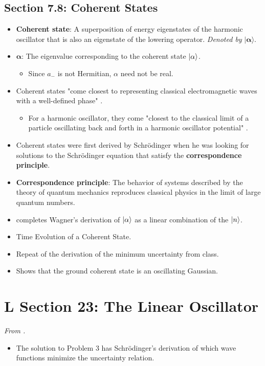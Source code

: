 \documentclass[../notes.tex]{subfiles}
\begin{document}
\subsection*{Section 7.8: Coherent States}
\begin{itemize}
    \item \textbf{Coherent state}: A superposition of energy eigenstates of the harmonic oscillator that is also an eigenstate of the lowering operator. \emph{Denoted by} $\bm{|\alpha\rangle}$.
    \item $\bm{\alpha}$: The eigenvalue corresponding to the coherent state $\ket{\alpha}$.
    \begin{itemize}
        \item Since $a_-$ is not Hermitian, $\alpha$ need not be real.
    \end{itemize}
    \item Coherent states "come closest to representing classical electromagnetic waves with a well-defined phase" \parencite[263]{bib:Townsend}.
    \begin{itemize}
        \item For a harmonic oscillator, they come "closest to the classical limit of a particle oscillating back and forth in a harmonic oscillator potential" \parencite[263]{bib:Townsend}.
    \end{itemize}
    \item Coherent states were first derived by Schr\"{o}dinger when he was looking for solutions to the Schr\"{o}dinger equation that satisfy the \textbf{correspondence principle}.
    \item \textbf{Correspondence principle}: The behavior of systems described by the theory of quantum mechanics reproduces classical physics in the limit of large quantum numbers.
    \item \textcite{bib:Townsend} completes Wagner's derivation of $\ket{\alpha}$ as a linear combination of the $\ket{n}$.
    \item Time Evolution of a Coherent State.
    \item Repeat of the derivation of the minimum uncertainty from class.
    \item Shows that the ground coherent state is an oscillating Gaussian.
\end{itemize}



\section{L Section 23: The Linear Oscillator}
\emph{From \textcite{bib:Landau}.}
\begin{itemize}
    \item The solution to Problem 3 has Schr\"{o}dinger's derivation of which wave functions minimize the uncertainty relation.
\end{itemize}
\end{document}
